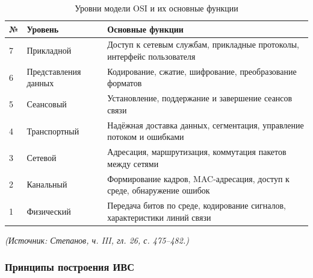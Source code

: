 \documentclass[a4paper,12pt]{article}
\begin{document}
\begin{table}[h]
\centering
\caption{Уровни модели OSI и их основные функции}
\label{tab:osi-levels}
\begin{tabular}{p{1.2cm}p{4.2cm}p{7.8cm}}
\toprule
\textbf{№} & \textbf{Уровень} & \textbf{Основные функции} \\
\midrule
7 & Прикладной & Доступ к сетевым службам, прикладные протоколы, интерфейс пользователя \\
6 & Представления данных & Кодирование, сжатие, шифрование, преобразование форматов \\
5 & Сеансовый & Установление, поддержание и завершение сеансов связи \\
4 & Транспортный & Надёжная доставка данных, сегментация, управление потоком и ошибками \\
3 & Сетевой & Адресация, маршрутизация, коммутация пакетов между сетями \\
2 & Канальный & Формирование кадров, MAC-адресация, доступ к среде, обнаружение ошибок \\
1 & Физический & Передача битов по среде, кодирование сигналов, характеристики линий связи \\
\bottomrule
\end{tabular}
\end{table}

\textit{(Источник: Степанов, ч. III, гл. 26, с. 475–482.)}

\subsubsection{Принципы построения ИВС}
\end{document}
